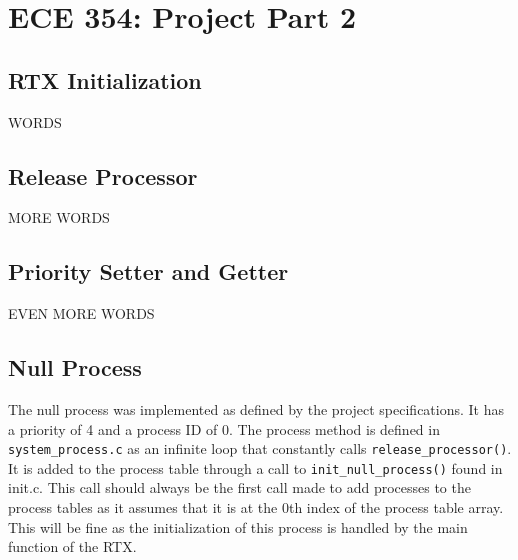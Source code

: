 \documentclass[oneside]{article}
\begin{document}
\lstset{language=C}
\section*{ECE 354: Project Part 2}
\subsection*{RTX Initialization} 
WORDS

\subsection*{Release Processor}
MORE WORDS

\subsection*{Priority Setter and Getter}
EVEN MORE WORDS

\subsection*{Null Process}
The null process was implemented as defined by the project specifications. It
has a priority of 4 and a process ID of 0. The process method is defined in
\texttt{system\_process.c} as an infinite loop that constantly calls
\texttt{release\_processor()}. It is added to the process table through a call to
\texttt{init\_null\_process()} found in init.c. This call should always be the first
call made to add processes to the process tables as it assumes that it is at
the 0th index of the process table array. This will be fine as the
initialization of this process is handled by the main function of the RTX.
\end{document}
